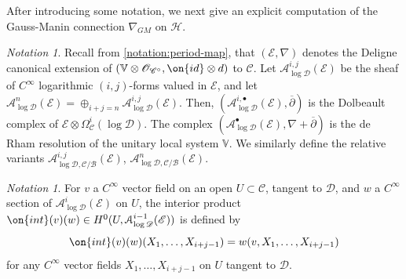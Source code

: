 \documentclass[12 pt]{amsart}
\theoremstyle{plain}
\theoremstyle{definition}
\theoremstyle{remark}
\newtheorem{notation}[subsubsection]{Notation}
\numberwithin{equation}{section}
\begin{document}
After introducing some notation, we next give an explicit computation of the Gauss-Manin connection $\nabla_{GM}$ on $\mathscr{H}$. 

\begin{notation}
	\label{notation:}
	Recall from \autoref{notation:period-map}, that $(\mathscr E, \nabla)$ denotes the Deligne canonical extension of
$(\mathbb V \otimes \mathscr O_{\mathscr C^\circ}, \on{id} \otimes d)$ to
$\mathscr C$.
	Let $\mathcal{A}^{i,j}_{\log \mathscr{D}}(\mathscr{E})$ be the sheaf of $C^\infty$ logarithmic $(i,j)$-forms valued in $\mathscr{E}$, and let $\mathcal{A}^n_{\log \mathscr{D}}(\mathscr{E})=\oplus_{i+j=n} \mathcal{A}^{i,j}_{\log \mathscr{D}}(\mathscr{E})$. 
	Then, $(\mathcal{A}^{i,\bullet}_{\log\mathscr{D}}(\mathscr{E}),
	\overline{\partial})$ is the Dolbeault complex of $\mathscr{E}\otimes
	\Omega^i_{\mathscr{C}}(\log \mathscr D)$. The complex
	$(\mathcal{A}^\bullet_{\log \mathscr{D}}(\mathscr{E}),
	\nabla+\overline{\partial})$ is the de Rham resolution of the unitary
	local system $\mathbb{V}$. We similarly define the relative variants  $\mathcal{A}^{i,j}_{\log \mathscr{D}, \mathscr{C}/\mathscr{B}}(\mathscr{E})$, $\mathcal{A}^{n}_{\log \mathscr{D}, \mathscr{C}/\mathscr{B}}(\mathscr{E})$.
\end{notation}
\begin{notation}
	\label{notation:}
	For $v$ a $C^\infty$ vector field on an open $U \subset \mathscr C$, tangent to $\mathscr{D}$, and
$w$ a $C^\infty$ section of $\mathcal{A}^i_{\log \mathscr{D}}(\mathscr{E})$ on $U$, the interior product
$\on{int}(v)(w) \in H^0(U, \mathcal{A}^{i-1}_{\log \mathscr D}(\mathscr E))$ is
defined by
$$\on{int}(v)(w)(X_1, \ldots, X_{i+j-1}) = w(v, X_1, \ldots, X_{i+j-1})$$ for any
$C^\infty$ vector fields $X_1, \ldots, X_{i+j-1}$ on $U$ tangent to $\mathscr{D}$.
\end{notation}
\end{document}
